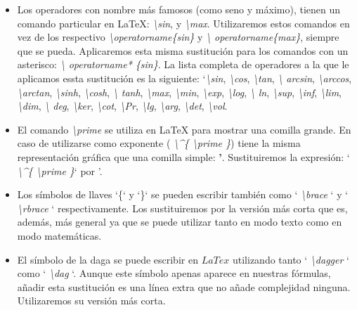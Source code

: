 \documentclass[a4paper, 20pt, dvipsnames]{article}
\begin{document}
\begin{itemize}
\item
  Los operadores con nombre más famosos (como seno y máximo), tienen un
  comando particular en \LaTeX{}: \emph{\textbackslash sin}, y
  \emph{\textbackslash max}. Utilizaremos estos comandos en vez de los
  respectivo \emph{\textbackslash operatorname\{sin\}} y \emph{\textbackslash
    operatorname\{max\}}, siempre que se pueda. Aplicaremos esta misma
  sustitución para los comandos con un asterisco: \emph{\textbackslash
    operatorname* \{sin\}}. La lista completa de operadores a la que le
  aplicamos essta sustitución es la siguiente: `\emph{\textbackslash sin},
  \emph{\textbackslash cos}, \emph{\textbackslash tan}, \emph{\textbackslash
    arcsin}, \emph{\textbackslash arccos}, \emph{\textbackslash arctan},
  \emph{\textbackslash sinh}, \emph{\textbackslash cosh}, \emph{\textbackslash
    tanh}, \emph{\textbackslash max}, \emph{\textbackslash min},
  \emph{\textbackslash exp}, \emph{\textbackslash log}, \emph{\textbackslash
    ln}, \emph{\textbackslash sup}, \emph{\textbackslash inf},
  \emph{\textbackslash lim}, \emph{\textbackslash dim}, \emph{\textbackslash
    deg}, \emph{\textbackslash ker}, \emph{\textbackslash cot},
  \emph{\textbackslash Pr}, \emph{\textbackslash lg}, \emph{\textbackslash arg},
  \emph{\textbackslash det}, \emph{\textbackslash vol}.

\item
  El comando \emph{\textbackslash prime} se utiliza en \LaTeX{} para mostrar
  una comilla grande. En caso de utilizarse como exponente (\emph{
    \textbackslash \textasciicircum \{ \textbackslash prime \}}) tiene la misma
  representación gráfica que una comilla simple: \textbf{'}. Sustituiremos la
  expresión: `\emph{ \textbackslash \textasciicircum \{ \textbackslash prime
    \}}` por '.

\item
  Los símbolos de llaves `\{` y `\}` se pueden escribir también como `\emph{
    \textbackslash brace }` y `\emph{ \textbackslash rbrace }`
  respectivamente. Los sustituiremos por la versión más corta que es, además,
  más general ya que se puede utilizar tanto en modo texto como en modo
  matemáticas.

\item
  El símbolo de la daga se puede escribir en $LaTex$ utilizando tanto `\emph{
    \textbackslash dagger }` como `\emph{ \textbackslash dag }`. Aunque este
  símbolo apenas aparece en nuestras fórmulas, añadir esta sustitución es una
  línea extra que no añade complejidad ninguna. Utilizaremos su versión más
  corta.


\end{itemize}
\end{document}
